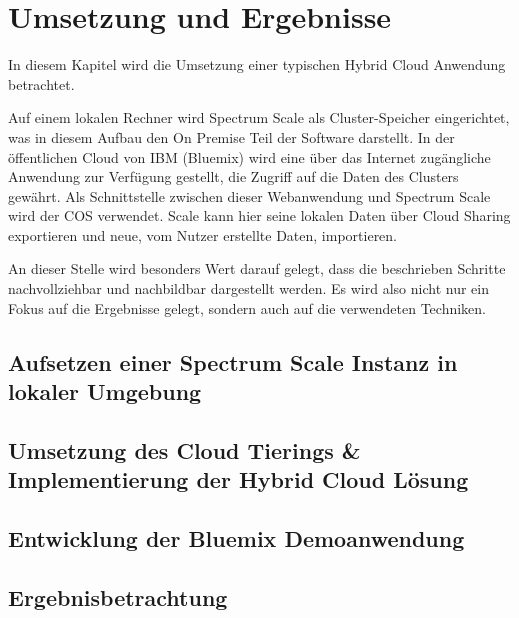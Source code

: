 \chapter{Umsetzung und Ergebnisse}\label{ch:realization}

In diesem Kapitel wird die Umsetzung einer typischen Hybrid Cloud Anwendung betrachtet. 

Auf einem lokalen Rechner wird Spectrum Scale als Cluster-Speicher eingerichtet, was in diesem Aufbau den \gls{On Premise} Teil der Software darstellt.
In der öffentlichen Cloud von IBM (Bluemix) wird eine über das Internet zugängliche Anwendung zur Verfügung gestellt, die Zugriff auf die Daten des Clusters gewährt. Als Schnittstelle zwischen dieser Webanwendung und Spectrum Scale wird der \ac{COS} verwendet. Scale kann hier seine lokalen Daten über Cloud Sharing exportieren und neue, vom Nutzer erstellte Daten, importieren.

An dieser Stelle wird besonders Wert darauf gelegt, dass die beschrieben Schritte nachvollziehbar und nachbildbar dargestellt werden. Es wird also nicht nur ein Fokus auf die Ergebnisse gelegt, sondern auch auf die verwendeten Techniken.

\section{Aufsetzen einer Spectrum Scale Instanz in lokaler Umgebung}


\section{Umsetzung des Cloud Tierings \& Implementierung der Hybrid Cloud Lösung}


\section{Entwicklung der Bluemix Demoanwendung}


\section{Ergebnisbetrachtung}

